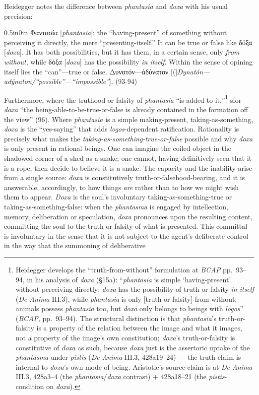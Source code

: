 \documentclass{article}
\newcommand{\gk}[1]{{\greekfont #1}}
\begin{document}
Heidegger notes the difference between \textit{phantasia} and \textit{doxa} with his usual precision: 
\begin{adjustwidth}{0.5in}{0in}
    \gk{Φαντασία} [\textit{phantasia}]: the ``having-present'' of something without perceiving it directly, the mere ``presenting-itself.'' It can be true or false like \gk{δόξα} [\textit{doxa}]. It has both possibilities, but it has them, in a certain sense, only \textit{from without}, while \gk{δόξα} [\textit{doxa}] has the possibility \textit{in itself}. Within the sense of opining itself lies the ``can''---true or false. \gk{Δυνατόν---ἀδύνατον} [(]\textit{Dynatón---adýnaton/``possible''---``impossible''}]. (93-94)
\end{adjustwidth}
Furthermore, where the truthood or falsity of \textit{phantasia} ``is added to it,''\footnote{Heidegger develops the ``truth-from-without'' formulation at \textit{BCAP} pp.~93--94, in his analysis of \textit{doxa} (§15a): ``\textit{phantasia} is simple `having-present' without perceiving directly; \textit{doxa} has the possibility of truth or falsity \textit{in itself} (\textit{De Anima} III.3), while \textit{phantasia} is only [truth or falsity] from without; animals possess \textit{phantasia} too, but \textit{doxa} only belongs to beings with \textit{logos}'' (\textit{BCAP}, pp.~93--94). The structural distinction is that \textit{phantasia}'s truth-or-falsity is a property of the relation between the image and what it images, not a property of the image's own constitution; \textit{doxa}'s truth-or-falsity is constitutive of \textit{doxa} as such, because \textit{doxa} just is the assertoric uptake of the \textit{phantasma} under \textit{pistis} (\textit{De Anima} III.3, 428a19--24) --- the truth-claim is internal to \textit{doxa}'s own mode of being. Aristotle's source-claim is at \textit{De Anima} III.3, 428a3--4 (the \textit{phantasia}/\textit{doxa} contrast) + 428a18--21 (the \textit{pistis}-condition on \textit{doxa}).} sfor \textit{doxa} ``the being-able-to-be-true-or-false is already contained in the formation off the view'' (96). Where \textit{phantasia} is a simple making-present, taking-as-something, \textit{doxa} is the ``yes-saying'' that adds \textit{logos}-dependent ratification. Rationality is precisely what makes the \textit{taking-as-something-true-or-false} possible and why \textit{doxa} is only present in rational beings. One can imagine the coiled object in the shadowed corner of a shed as a snake; one cannot, having definitively seen that it is a rope, then decide to believe it is a snake. The capacity and the inability arise from a single source: \textit{doxa} is constitutively truth-or-falsehood-bearing, and it is answerable, accordingly, to how things \textit{are} rather than to how we might wish them to appear. \textit{Doxa} is the soul's involuntary taking-as-something-true or taking-as-something-false: when the \textit{phantasma} is engaged by intellection, memory, deliberation or speculation, \textit{doxa} pronounces upon the resulting content, committing the soul to the truth or falsity of what is presented. This committal is involuntary in the sense that it is not subject to the agent's deliberate control in the way that the summoning of deliberative 
\end{document}
